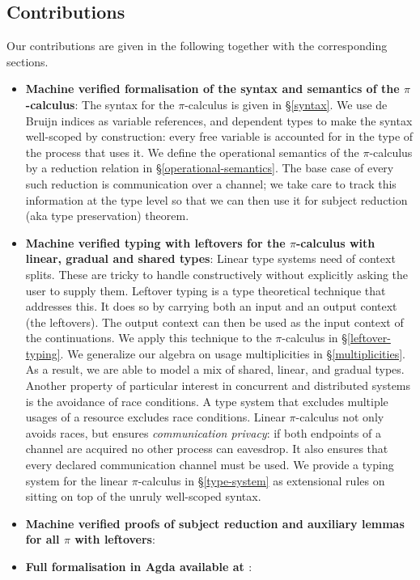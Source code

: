 \documentclass[a4paper,UKenglish,cleveref, autoref, thm-restate,authorcolumns]{lipics-v2019}
\theoremstyle{definition}
\newcommand{\picalc}{$\pi$-calculus}
\begin{document}
\subsection{Contributions}
Our contributions are given in the following together with the corresponding sections.
\begin{itemize}
  \item \textbf{Machine verified formalisation of the syntax and semantics of the \picalc{}}: The syntax for the \picalc{} is given in \S \ref{syntax}.
  We use de Bruijn indices \cite{} as variable references, and dependent types to make the syntax well-scoped by construction: every free variable is accounted for in the type of the process that uses it.
  We define the operational semantics of the \picalc{} by a reduction relation in \S \ref{operational-semantics}.
  The base case of every such reduction is communication over a channel; we take care to track this information at the type level so that we can then use it for subject reduction (aka type preservation) theorem.

  \item \textbf{Machine verified typing with leftovers for the \picalc{} with linear, gradual and shared types}:
  Linear type systems need of context splits.
  These are tricky to handle constructively without explicitly asking the user to supply them.
  Leftover typing \cite{} is a type theoretical technique that addresses this.
  It does so by carrying both an input and an output context (the leftovers).
  The output context can then be used as the input context of the continuations.
  We apply this technique to the \picalc{} in \S \ref{leftover-typing}.
  We generalize our algebra on usage multiplicities in \S \ref{multiplicities}.
  As a result, we are able to model a mix of shared, linear, and gradual types.
  Another property of particular interest in concurrent and distributed systems is the avoidance of race conditions.
  A type system that excludes multiple usages of a resource excludes race conditions. Linear \picalc{} not only avoids races, but ensures \emph{communication privacy}: if both endpoints of a channel are acquired no other process can eavesdrop.
  It also ensures that every declared communication channel must be used.
  We provide a typing system for the linear \picalc{} in \S \ref{type-system} as extensional rules on sitting on top of the unruly well-scoped syntax.
  
  \item \textbf{Machine verified proofs of subject reduction and auxiliary lemmas for all $\pi$ with leftovers}:
  
  \item \textbf{Full formalisation in Agda available at \cite{Zalakain2020Agda}}:
\end{itemize}
\end{document}
